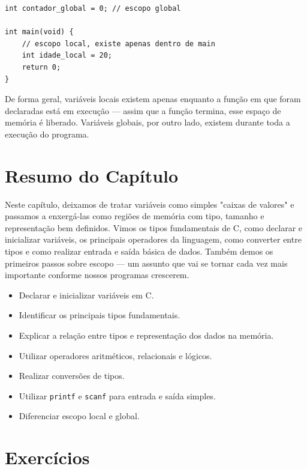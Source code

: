 \documentclass[12pt,a4paper,oneside]{extreport}
\begin{document}
\begin{lstlisting}
int contador_global = 0; // escopo global

int main(void) {
    // escopo local, existe apenas dentro de main
    int idade_local = 20; 
    return 0;
}
\end{lstlisting}

De forma geral, variáveis locais existem apenas enquanto a função em que foram declaradas está em execução — assim que a função termina, esse espaço de memória é liberado. Variáveis globais, por outro lado, existem durante toda a execução do programa.


\section*{Resumo do Capítulo}
Neste capítulo, deixamos de tratar variáveis como simples "caixas de valores" e passamos a enxergá-las como regiões de memória com tipo, tamanho e representação bem definidos. Vimos os tipos fundamentais de C, como declarar e inicializar variáveis, os principais operadores da linguagem, como converter entre tipos e como realizar entrada e saída básica de dados. Também demos os primeiros passos sobre escopo — um assunto que vai se tornar cada vez mais importante conforme nossos programas crescerem.

\begin{tcolorbox}[title={Ao final deste capítulo, você deve ser capaz de:}]
\begin{itemize}
    \item Declarar e inicializar variáveis em C.
    \item Identificar os principais tipos fundamentais.
    \item Explicar a relação entre tipos e representação dos dados na memória.
    \item Utilizar operadores aritméticos, relacionais e lógicos.
    \item Realizar conversões de tipos.
    \item Utilizar \texttt{printf} e \texttt{scanf} para entrada e saída simples.
    \item Diferenciar escopo local e global.
\end{itemize}
\end{tcolorbox}

\section*{Exercícios}
\end{document}

